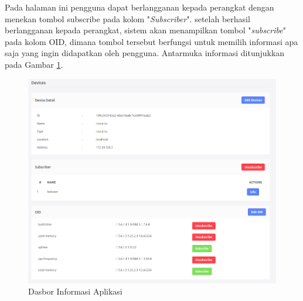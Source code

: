          	Pada halaman ini pengguna dapat berlangganan kepada perangkat dengan menekan tombol subscribe pada kolom "\textit{Subscriber}". setelah berhasil berlangganan kepada perangkat, sistem akan menampilkan tombol "\textit{subscribe}" pada kolom OID, dimana tombol tersebut berfungsi untuk memilih informasi apa saja yang ingin didapatkan oleh pengguna. Antarmuka informasi ditunjukkan pada Gambar \ref{antarmuka:rincianperangkat}.
         	\begin{figure}[H]
         		\centering
         		\includegraphics[width=11.2cm]{Images/C-4/antarmukarincianperangkat.png}
         		\caption{Dasbor Informasi Aplikasi}
         		\label{antarmuka:rincianperangkat}
         	\end{figure}
            
